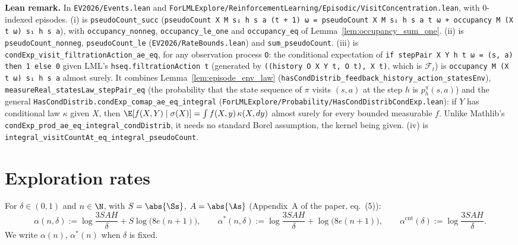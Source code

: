\textbf{Lean remark.} In \texttt{EV2026/Events.lean} and \texttt{ForLMLExplore/ReinforcementLearning/Episodic/VisitConcentration.lean}, with
$0$-indexed episodes. (i) is \texttt{pseudoCount\_succ}
(\texttt{pseudoCount X M s₁ h s a (t + 1) ω = pseudoCount X M s₁ h s a t ω + occupancy M (X t ω) s₁ h s a}),
with \texttt{occupancy\_nonneg}, \texttt{occupancy\_le\_one} and \texttt{occupancy\_eq} of
Lemma~\ref{lem:occupancy_sum_one}. (ii) is \texttt{pseudoCount\_nonneg}, \texttt{pseudoCount\_le}
(\texttt{EV2026/RateBounds.lean}) and \texttt{sum\_pseudoCount}. (iii) is
\texttt{condExp\_visit\_filtrationAction\_ae\_eq}, for any observation process \texttt{O}: the
conditional expectation of \texttt{if stepPair X Y h t ω = (s, a) then 1 else 0} given LML's
\texttt{hseq.filtrationAction t} (generated by \texttt{((history O X Y t, O t), X t)}, which is
$\mathcal F_t$) is \texttt{occupancy M (X t ω) s₁ h s a} almost surely. It combines
Lemma~\ref{lem:episode_env_law} (\texttt{hasCondDistrib\_feedback\_history\_action\_statesEnv}),
\texttt{measureReal\_statesLaw\_stepPair\_eq} (the probability that the state sequence of $\pi$
visits $(s, a)$ at the step $h$ is $p^\pi_h(s, a)$) and the general
\texttt{HasCondDistrib.condExp\_comap\_ae\_eq\_integral} (\texttt{ForLMLExplore/Probability/HasCondDistribCondExp.lean}):
if $Y$ has conditional law $\kappa$ given $X$, then $\E[f(X, Y) \mid \sigma(X)] = \int f(X, y)\,\kappa(X, dy)$
almost surely for every bounded measurable $f$. Unlike Mathlib's
\texttt{condExp\_prod\_ae\_eq\_integral\_condDistrib}, it needs no standard Borel assumption, the
kernel being given. (iv) is \texttt{integral\_visitCountAt\_eq\_integral\_pseudoCount}.

\section{Exploration rates}
\label{sec:empirical_rates}

\begin{definition}\label{def:rates}
\leanok
{}
For $\delta \in (0, 1)$ and $n \in \N$, with $S = \abs{\Ss}$, $A = \abs{\As}$ (Appendix~A of the
paper, eq.~(5)):
\[
  \alpha(n, \delta) := \log\frac{3 S A H}{\delta} + S \log\big(8 e (n + 1)\big),
  \qquad
  \alpha^*(n, \delta) := \log\frac{3 S A H}{\delta} + \log\big(8 e (n + 1)\big),
  \qquad
  \alpha^{\mathrm{cnt}}(\delta) := \log\frac{3 S A H}{\delta} .
\]
We write $\alpha(n)$, $\alpha^*(n)$ when $\delta$ is fixed.
\end{definition}

